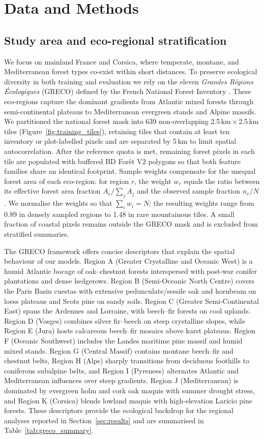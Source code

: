 \documentclass[utf8]{FrontiersinHarvard}
\begin{document}
\section{Data and Methods}

\subsection{Study area and eco-regional stratification}
\label{sec:greco}
We focus on mainland France and Corsica, where temperate, montane, and Mediterranean forest types co-exist within short distances. To preserve ecological diversity in both training and evaluation we rely on the eleven \emph{Grandes Régions Écologiques} (GRECO) defined by the French National Forest Inventory \citep{IGN2013GRECO}. These eco-regions capture the dominant gradients from Atlantic mixed forests through semi-continental plateaus to Mediterranean evergreen stands and Alpine massifs. We partitioned the national forest mask into 639 non-overlapping 2.5\,km\,$\times$\,2.5\,km tiles (Figure~\ref{fig:training_tiles}), retaining tiles that contain at least ten inventory or plot-labelled pixels and are separated by 5\,km to limit spatial autocorrelation. After the reference quota is met, remaining forest pixels in each tile are populated with buffered BD Forêt V2 polygons so that both feature families share an identical footprint. Sample weights compensate for the unequal forest area of each eco-region: for region \(r\), the weight \(w_r\) equals the ratio between its effective forest area fraction \(A_r/\sum_{j} A_j\) and the observed sample fraction \(n_r/N\). We normalise the weights so that \(\sum_i w_i = N\); the resulting weights range from 0.89 in densely sampled regions to 1.48 in rare mountainous tiles. A small fraction of coastal pixels remains outside the GRECO mask and is excluded from stratified summaries.

The GRECO framework offers concise descriptors that explain the spatial behaviour of our models. Region A (Greater Crystalline and Oceanic West) is a humid Atlantic bocage of oak–chestnut forests interspersed with post-war conifer plantations and dense hedgerows. Region B (Semi-Oceanic North Centre) covers the Paris Basin cuestas with extensive pedunculate/sessile oak and hornbeam on loess plateaus and Scots pine on sandy soils. Region C (Greater Semi-Continental East) spans the Ardennes and Lorraine, with beech–fir forests on cool uplands. Region D (Vosges) combines silver fir–beech on steep crystalline slopes, while Region E (Jura) hosts calcareous beech–fir mosaics above karst plateaus. Region F (Oceanic Southwest) includes the Landes maritime pine massif and humid mixed stands. Region G (Central Massif) contains montane beech–fir and chestnut belts, Region H (Alps) sharply transitions from deciduous foothills to coniferous subalpine belts, and Region I (Pyrenees) alternates Atlantic and Mediterranean influences over steep gradients. Region J (Mediterranean) is dominated by evergreen holm and cork oak maquis with summer drought stress, and Region K (Corsica) blends lowland maquis with high-elevation Laricio pine forests. These descriptors provide the ecological backdrop for the regional analyses reported in Section~\ref{sec:results} and are summarised in Table~\ref{tab:greco_summary}.
\end{document}
